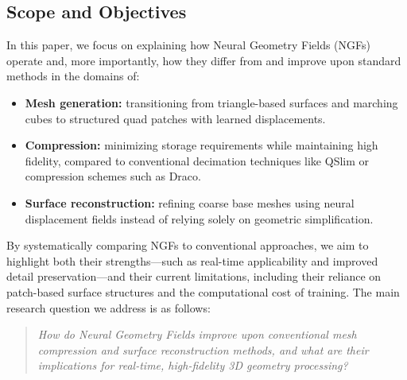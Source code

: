 \subsection{Scope and Objectives}
In this paper, we focus on explaining how Neural Geometry Fields (NGFs) operate and, more importantly, how they differ from and improve upon standard methods in the domains of:
\begin{itemize}
    \item \textbf{Mesh generation:} transitioning from triangle-based surfaces and marching cubes to structured quad patches with learned displacements.
    \item \textbf{Compression:} minimizing storage requirements while maintaining high fidelity, compared to conventional decimation techniques like QSlim or compression schemes such as Draco.
    \item \textbf{Surface reconstruction:} refining coarse base meshes using neural displacement fields instead of relying solely on geometric simplification.
\end{itemize}
By systematically comparing NGFs to conventional approaches, we aim to highlight both their strengths—such as real-time applicability and improved detail preservation—and their current limitations, including their reliance on patch-based surface structures and the computational cost of training.
The main research question we address is as follows:
\begin{quote}
\emph{How do Neural Geometry Fields improve upon conventional mesh compression and surface reconstruction methods, and what are their implications for real-time, high-fidelity 3D geometry processing?}
\end{quote}